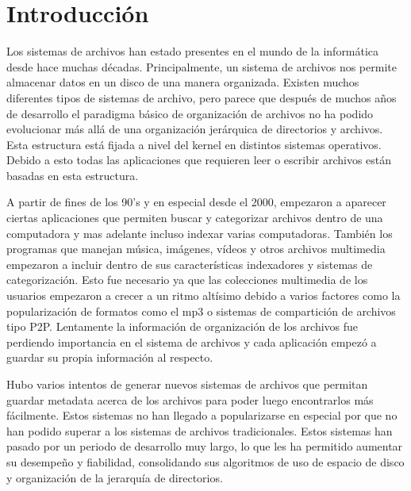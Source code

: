 \chapter{Introducción}
\ifpdf
    \graphicspath{{Introduction/IntroductionFigs/PNG/}{Introduction/IntroductionFigs/PDF/}{Introduction/IntroductionFigs/}}
\else
    \graphicspath{{Introduction/IntroductionFigs/EPS/}{Introduction/IntroductionFigs/}}
\fi

Los sistemas de archivos han estado presentes en el mundo de la informática desde hace muchas décadas. Principalmente, un sistema de archivos nos permite almacenar datos en un disco de una manera organizada. Existen muchos diferentes tipos de sistemas de archivo, pero parece que después de muchos años de desarrollo el paradigma básico de organización de archivos no ha podido evolucionar más allá de una organización jerárquica de directorios y archivos. Esta estructura está fijada a nivel del kernel en distintos sistemas operativos. Debido a esto todas las aplicaciones que requieren leer o escribir archivos están basadas en esta estructura.

A partir de fines de los 90's y en especial desde el 2000, empezaron a aparecer ciertas aplicaciones que permiten buscar y categorizar archivos dentro de una computadora y mas adelante incluso indexar varias computadoras. También los programas que manejan música, imágenes, vídeos y otros archivos multimedia empezaron a incluir dentro de sus características indexadores y sistemas de categorización. Esto fue necesario ya que las colecciones multimedia de los usuarios empezaron a crecer a un ritmo altísimo debido a varios factores como la popularización de formatos como el mp3 o sistemas de compartición de archivos tipo P2P. Lentamente la información de organización de los archivos fue perdiendo importancia en el sistema de archivos y cada aplicación empezó a guardar su propia información al respecto.

Hubo varios intentos de generar nuevos sistemas de archivos que permitan guardar metadata acerca de los archivos para poder luego encontrarlos más fácilmente. Estos sistemas no han llegado a popularizarse en especial por que no han podido superar a los sistemas de archivos tradicionales. Estos sistemas han pasado por un periodo de desarrollo muy largo, lo que les ha permitido aumentar su desempeño y fiabilidad, consolidando sus algoritmos de uso de espacio de disco y organización de la jerarquía de directorios.

